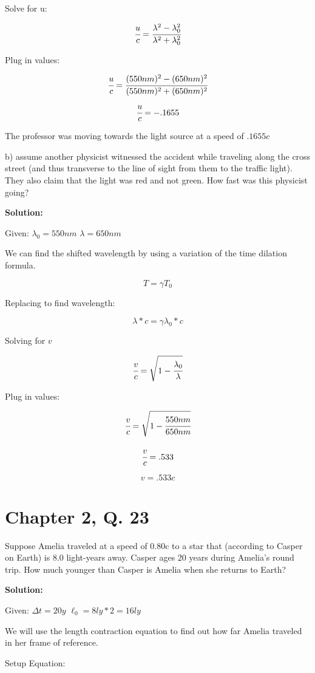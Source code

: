 \documentclass{article}
\begin{document}
Solve for u:

$$ \cfrac{u}{c} = \cfrac{\lambda^{2} - \lambda_0^{2}}{\lambda^{2}+\lambda_0^2} $$

Plug in values:

$$ \cfrac{u}{c} = \cfrac{(550nm)^2 - (650nm)^2}{(550nm)^2 + (650nm)^2} $$
$$ \cfrac{u}{c} = -.1655 $$

The professor was moving towards the light source at a speed of $ .1655c $

b) assume another physicist witnessed the accident while traveling along the cross street (and thus transverse to the line of sight from them to the traffic light). They also claim that the light was red and not green. How fast was this physicist going?

\textbf{Solution:}

Given: $\lambda_0 = 550nm$ $ \lambda = 650nm $

We can find the shifted wavelength by using a variation of the time dilation formula.

$$ T = \gamma T_0 $$

Replacing to find wavelength:

$$ \lambda * c = \gamma \lambda_0 * c $$

Solving for $v$

$$ \cfrac{v}{c} = \sqrt{1 - \cfrac{\lambda_0}{\lambda}} $$

Plug in values:

$$ \cfrac{v}{c} = \sqrt{1 - \cfrac{550nm}{650nm}} $$

$$ \cfrac{v}{c} = .533 $$

$$ v = .533c $$







\section*{Chapter 2, Q. 23}
Suppose Amelia traveled at a speed of 0.80c to a star that (according to Casper on Earth) is 8.0 light-years away.  Casper ages 20 years during Amelia's round trip. How much younger than Casper is Amelia when she returns to Earth?

\textbf{Solution:}

Given: $ \Delta t = 20y $ $ \ell_0 = 8ly * 2 = 16ly $

We will use the length contraction equation to find out how far Amelia traveled in her frame of reference.

Setup Equation:
\end{document}
